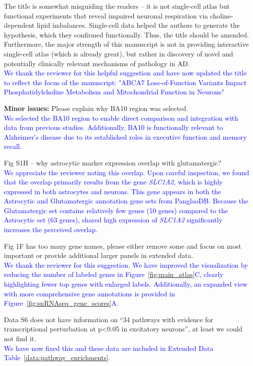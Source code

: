 \documentclass[12pt]{article}
\begin{document}
The title is somewhat misguiding the readers – it is not single-cell atlas but functional experiments that reveal impaired neuronal respiration via choline-dependent lipid imbalances. Single-cell data helped the authors to generate the hypothesis, which they confirmed functionally. Thus, the title should be amended. Furthermore, the major strength of this manuscript is not in providing interactive single-cell atlas (which is already great), but rather in discovery of novel and potentially clinically relevant mechanisms of pathology in AD.\\
\textcolor{blue}{We thank the reviewer for this helpful suggestion and have now updated the title to reflect the focus of the manuscript: "ABCA7 Loss-of-Function Variants Impact Phosphatidylcholine Metabolism and Mitochondrial Function in Neurons"}

\textbf{Minor issues:}
Please explain why BA10 region was selected.\\
\textcolor{blue}{We selected the BA10 region to enable direct comparison and integration with data from previous studies. Additionally, BA10 is functionally relevant to Alzheimer's disease due to its established roles in executive function and memory recall.}

Fig S1H – why astrocytic marker expression overlap with glutamatergic?\\	
\textcolor{blue}{We appreciate the reviewer noting this overlap. Upon careful inspection, we found that the overlap primarily results from the gene \textit{SLC1A2}, which is highly expressed in both astrocytes and neurons. This gene appears in both the Astrocytic and Glutamatergic annotation gene sets from PanglaoDB. Because the Glutamatergic set contains relatively few genes (10 genes) compared to the Astrocytic set (63 genes), shared high expression of \textit{SLC1A2} significantly increases the perceived overlap.}

Fig 1F has too many gene names, please either remove some and focus on most important or provide additional larger panels in extended data.\\
\textcolor{blue}{We thank the reviewer for this suggestion. We have improved the visualization by reducing the number of labeled genes in Figure~\ref{fig:main_atlas}C, clearly highlighting fewer top genes with enlarged labels. Additionally, an expanded view with more comprehensive gene annotations is provided in Figure~\ref{fig:snRNAseq_gene_scores}A.}

Data S6 does not have information on “34 pathways with evidence for transcriptional perturbation at p<0.05 in excitatory neurons”, at least we could not find it.\\
\textcolor{blue}{We have now fixed this and these data are included in Extended Data Table~\ref{data:pathway_enrichments}.}
\end{document}
